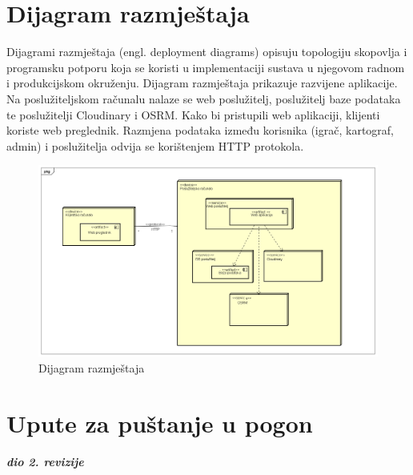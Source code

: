 				
			\eject 
		
		
		\section{Dijagram razmještaja}
			
			
			
			{Dijagrami razmještaja (engl. deployment diagrams) opisuju topologiju skopovlja i programsku potporu koja se koristi u implementaciji sustava u njegovom radnom i produkcijskom okruženju. Dijagram razmještaja prikazuje razvijene aplikacije. Na poslužiteljskom računalu nalaze se web poslužitelj, poslužitelj baze podataka te poslužitelji Cloudinary i OSRM. Kako bi pristupili web aplikaciji, klijenti koriste web preglednik. Razmjena podataka između korisnika (igrač, kartograf, admin) i poslužitelja odvija se korištenjem HTTP protokola.}
			\begin{figure}[H]
				\includegraphics[width=\textwidth]{dijagrami/dijagram_razmjestaja} 
				\centering
				\caption{Dijagram razmještaja}
				\label{}
			\end{figure}
			\eject 
		
		\section{Upute za puštanje u pogon}
		
			\textbf{\textit{dio 2. revizije}}\\
		
